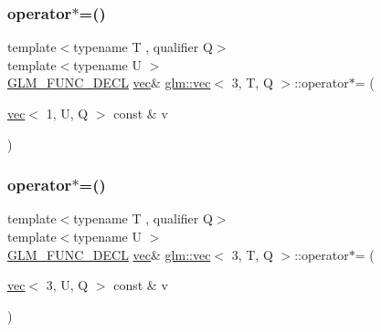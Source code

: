 \mbox{\label{structglm_1_1vec_3_013_00_01_t_00_01_q_01_4_ab92a53416987503f1fcf90654e0512fd}} 
\subsubsection{\texorpdfstring{operator$\ast$=()}{operator*=()}\hspace{0.1cm}{\footnotesize\ttfamily [2/6]}}
{\footnotesize\ttfamily template$<$typename T , qualifier Q$>$ \\
template$<$typename U $>$ \\
\mbox{\hyperlink{setup_8hpp_ab2d052de21a70539923e9bcbf6e83a51}{G\+L\+M\+\_\+\+F\+U\+N\+C\+\_\+\+D\+E\+CL}} \mbox{\hyperlink{structglm_1_1vec}{vec}}\& \mbox{\hyperlink{structglm_1_1vec}{glm\+::vec}}$<$ 3, T, Q $>$\+::operator$\ast$= (\begin{DoxyParamCaption}\item[{\mbox{\hyperlink{structglm_1_1vec}{vec}}$<$ 1, U, Q $>$ const \&}]{v }\end{DoxyParamCaption})}

\mbox{\label{structglm_1_1vec_3_013_00_01_t_00_01_q_01_4_a6ac07056cd1518270e77cdcce4fb3fe5}} 
\subsubsection{\texorpdfstring{operator$\ast$=()}{operator*=()}\hspace{0.1cm}{\footnotesize\ttfamily [3/6]}}
{\footnotesize\ttfamily template$<$typename T , qualifier Q$>$ \\
template$<$typename U $>$ \\
\mbox{\hyperlink{setup_8hpp_ab2d052de21a70539923e9bcbf6e83a51}{G\+L\+M\+\_\+\+F\+U\+N\+C\+\_\+\+D\+E\+CL}} \mbox{\hyperlink{structglm_1_1vec}{vec}}\& \mbox{\hyperlink{structglm_1_1vec}{glm\+::vec}}$<$ 3, T, Q $>$\+::operator$\ast$= (\begin{DoxyParamCaption}\item[{\mbox{\hyperlink{structglm_1_1vec}{vec}}$<$ 3, U, Q $>$ const \&}]{v }\end{DoxyParamCaption})}


